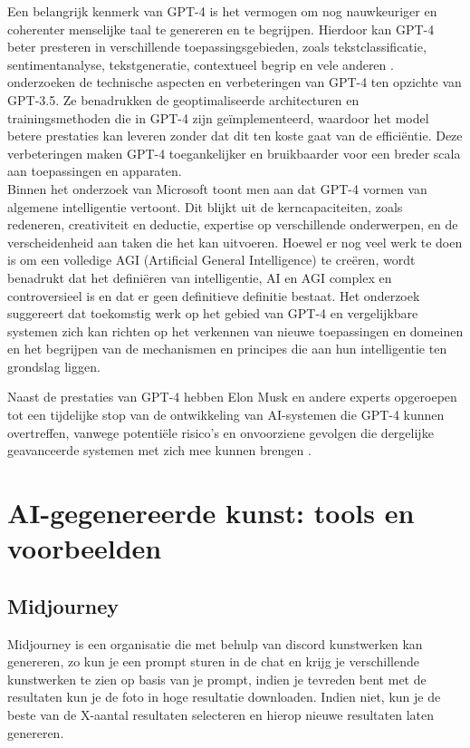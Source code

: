 Een belangrijk kenmerk van GPT-4 is het vermogen om nog nauwkeuriger en coherenter menselijke taal te genereren en te begrijpen. Hierdoor kan GPT-4 beter presteren in verschillende toepassingsgebieden, zoals tekstclassificatie, sentimentanalyse, tekstgeneratie, contextueel begrip en vele anderen \autocite{gpt_micai}. \\

\autocite{gpt_cn} onderzoeken de technische aspecten en verbeteringen van GPT-4 ten opzichte van GPT-3.5. Ze benadrukken de geoptimaliseerde architecturen en trainingsmethoden die in GPT-4 zijn geïmplementeerd, waardoor het model betere prestaties kan leveren zonder dat dit ten koste gaat van de efficiëntie. Deze verbeteringen maken GPT-4 toegankelijker en bruikbaarder voor een breder scala aan toepassingen en apparaten. \\

Binnen het onderzoek van Microsoft \autocite{gpt_micai} toont men aan dat GPT-4 vormen van algemene intelligentie vertoont. Dit blijkt uit de kerncapaciteiten, zoals redeneren, creativiteit en deductie, expertise op verschillende onderwerpen, en de verscheidenheid aan taken die het kan uitvoeren. Hoewel er nog veel werk te doen is om een volledige AGI (Artificial General Intelligence) te creëren, wordt benadrukt dat het definiëren van intelligentie, AI en AGI complex en controversieel is en dat er geen definitieve definitie bestaat. Het onderzoek suggereert dat toekomstig werk op het gebied van GPT-4 en vergelijkbare systemen zich kan richten op het verkennen van nieuwe toepassingen en domeinen en het begrijpen van de mechanismen en principes die aan hun intelligentie ten grondslag liggen.

Naast de prestaties van GPT-4 hebben Elon Musk en andere experts opgeroepen tot een tijdelijke stop van de ontwikkeling van AI-systemen die GPT-4 kunnen overtreffen, vanwege potentiële risico's en onvoorziene gevolgen die dergelijke geavanceerde systemen met zich mee kunnen brengen \autocite{reuters_musk}. 
 
\section{AI-gegenereerde kunst: tools en voorbeelden}
\subsection{ Midjourney}
Midjourney is een organisatie die met behulp van discord kunstwerken kan genereren, zo kun je een prompt sturen in de chat en krijg je verschillende kunstwerken te zien op basis van je prompt, indien je tevreden bent met de resultaten kun je de foto in hoge resultatie downloaden. Indien niet, kun je de beste van de X-aantal resultaten selecteren en hierop nieuwe resultaten laten genereren. 

